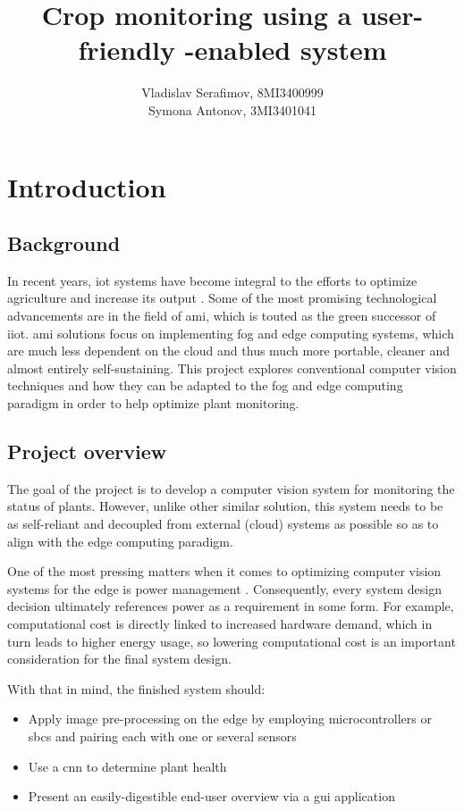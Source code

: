 \documentclass{report}
\title{Crop monitoring using a user-friendly \glsfmtshort{iot}-enabled system}
\author{Vladislav Serafimov, 8MI3400999 \\ 
Symona Antonov, 3MI3401041}
\begin{document}
	\maketitle
	
	\tableofcontents
	
	\chapter{Introduction}
	
	\section{Background}
	In recent years, \gls{iot} systems have become integral to the efforts to optimize agriculture and increase its output \cite{xu2022review}. Some of the most promising technological advancements are in the field of \gls{ami}, which is touted as the green successor of \gls{iiot}. \Gls{ami} solutions focus on implementing fog and edge computing systems, which are much less dependent on the cloud and thus much more portable, cleaner and almost entirely self-sustaining. This project explores conventional computer vision techniques and how they can be adapted to the fog and edge computing paradigm in order to help optimize plant monitoring.
	
	\section{Project overview}\label{chap:project_overview}
	The goal of the project is to develop a computer vision system for monitoring the status of plants. However, unlike other similar solution, this system needs to be as self-reliant and decoupled from external (cloud) systems as possible so as to align with the edge computing paradigm.
	
	One of the most pressing matters when it comes to optimizing computer vision systems for the edge is power management \cite{kalyani2021systematic}. Consequently, every system design decision ultimately references power as a requirement in some form. For example, computational cost is directly linked to increased hardware demand, which in turn leads to higher energy usage, so lowering computational cost is an important consideration for the final system design.
	
	
	With that in mind, the finished system should:
	\begin{itemize}
		\item Apply image pre-processing on the edge by employing microcontrollers or \glspl{sbc} and pairing each with one or several sensors
		\item Use a \gls{cnn} to determine plant health
		\item Present an easily-digestible end-user overview via a \gls{gui} application
	\end{itemize}
	
\end{document}
